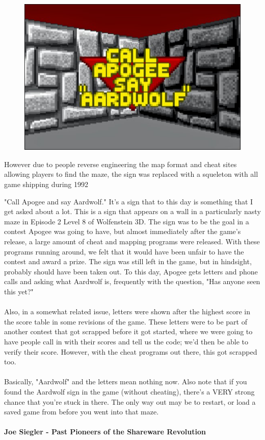 \begin{figure}[H]
  \centering
 \includegraphics[width=\textwidth]{imgs/call_apogee.png}
\end{figure}
\par
However due to people reverse engineering the map format and cheat sites allowing players to find the maze, the sign was replaced with a squeleton with all game shipping during 1992
\par
\begin{fancyquotes}
"Call Apogee and say Aardwolf."  It's a sign that to this day is something
that I get asked about a lot.  This is a sign that appears on a wall in a
particularly nasty maze in Episode 2 Level 8 of Wolfenstein 3D.  The sign
was to be the goal in a contest Apogee was going to have, but almost
immediately after the game's release, a large amount of cheat and mapping
programs were released.  With these programs running around, we felt that
it would have been unfair to have the contest and award a prize.  The sign
was still left in the game, but in hindsight, probably should have been
taken out.  To this day, Apogee gets letters and phone calls and asking
what Aardwolf is, frequently with the question, "Has anyone seen this yet?"\\
\\
Also, in a somewhat related issue, letters were shown after the highest score
in the score table in some revisions of the game.  These letters were to be
part of another contest that got scrapped before it got started, where we were
going to have people call in with their scores and tell us the code; we'd then
be able to verify their score.  However, with the cheat programs out there,
this got scrapped too.\\
\\
Basically, "Aardwolf" and the letters mean nothing now.  Also note that if
you found the Aardwolf sign in the game (without cheating), there's a VERY
strong chance that you're stuck in there.  The only way out may be to restart,
or load a saved game from before you went into that maze.\\
\\
\textbf{Joe Siegler - Past Pioneers of the Shareware Revolution}
\end{fancyquotes}
